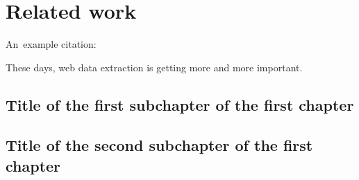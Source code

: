 \chapter{Related work}

An~example citation: \cite{Andel07}

These days, web data extraction is getting more and more important.
\section{Title of the first subchapter of the first chapter}

\section{Title of the second subchapter of the first chapter}
